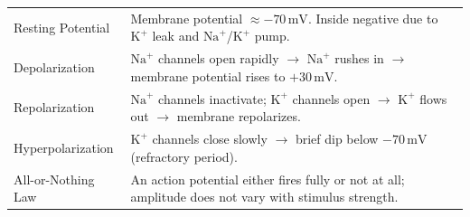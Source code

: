\documentclass[12pt,a4paper]{article}
\renewcommand{\arraystretch}{1.45}
\begin{document}
\begin{tcolorbox}[formulabox, title={\textbf{The Action Potential --- Phases and Ion Movements}}]
\renewcommand{\arraystretch}{1.3}
\begin{tabularx}{\linewidth}{B{3.2cm} X}
Resting Potential & Membrane potential $\approx -70\,\text{mV}$. Inside negative due to $\text{K}^+$ leak and $\text{Na}^+$/$\text{K}^+$ pump. \\[4pt]
Depolarization & $\text{Na}^+$ channels open rapidly $\to$ $\text{Na}^+$ rushes in $\to$ membrane potential rises to $+30\,\text{mV}$. \\[4pt]
Repolarization & $\text{Na}^+$ channels inactivate; $\text{K}^+$ channels open $\to$ $\text{K}^+$ flows out $\to$ membrane repolarizes. \\[4pt]
Hyperpolarization & $\text{K}^+$ channels close slowly $\to$ brief dip below $-70\,\text{mV}$ (refractory period). \\[4pt]
All-or-Nothing Law & An action potential either fires fully or not at all; amplitude does not vary with stimulus strength.
\end{tabularx}
\end{tcolorbox}
\end{document}

